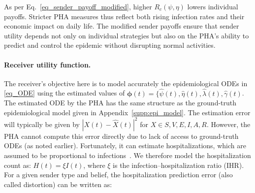\documentclass[sigconf,review]{acmart}
\newcommand{\abs}[1]{\left| #1 \right|}
\begin{document}
As per Eq.~\eqref{eq_sender_payoff_modified}, higher $R_c(\psi,\eta)$ lowers individual payoffs. Stricter PHA measures thus reflect both rising infection rates and their economic impact on daily life. The modified sender payoffs ensure that sender utility depends not only on individual strategies but also on the PHA's ability to predict and control the epidemic without disrupting normal activities.



\paragraph{Receiver utility function.}
The receiver's objective here is to model accurately the epidemiological ODEs in \eqref{eq_ODE} using the estimated values of $\boldsymbol{\phi}(t) = \{\widehat{\psi}(t), \widehat{\eta}(t), \widehat{\lambda}(t), \widehat{\gamma}(t)$. The estimated ODE by the PHA has the same structure as the ground-truth epidemiological model given in Appendix~\ref{supp:epi_model}. The estimation error will typically be given by $\abs{X(t) - \widehat{X}(t)}^2$ for $X \in {S,V,E,I,A,R}$. However, the PHA cannot compute this error directly due to lack of access to ground-truth ODEs (as noted earlier). Fortunately, it can estimate hospitalizations, which are assumed to be proportional to infections~\cite{FoxPNAS2022}. We therefore model the hospitalization count as:
$H(t) = \xi I(t)$,
where $\xi$ is the infection--hospitalization ratio (IHR).
For a given sender type and belief,  the hospitalization prediction error (also called distortion) can be written as:
\end{document}
